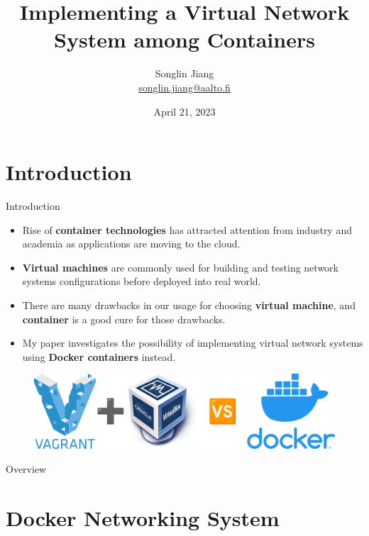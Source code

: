 \documentclass{beamer}
\title{Implementing a Virtual Network\\ System among Containers}
\author{\texorpdfstring{Songlin Jiang\\ \url{songlin.jiang@aalto.fi}}{Songlin Jiang}}
\institute{Tutor: Tuomas Aura}
\date{April 21, 2023}
\begin{document}
\frame{\titlepage}

\section{Introduction}
\begin{frame}{Introduction}
\begin{itemize}
\item Rise of \textbf{container technologies} has attracted attention from industry and academia as applications are moving to the cloud.
\item \textbf{Virtual machines} are commonly used for building and testing network systems configurations before deployed into real world.
\item There are many drawbacks in our usage for choosing \textbf{virtual machine}, and \textbf{container} is a good cure for those drawbacks.
\item My paper investigates the possibility of implementing virtual network systems using \textbf{Docker containers} instead.
\end{itemize}
\begin{figure}[t!]
  \begin{center}
    \includegraphics[scale=0.48]{slide/img/vs.png}
    \label{fig:demo}
  \end{center}
\end{figure}
\end{frame}

\begin{frame}{Overview}
    \tableofcontents
\end{frame}

\section{Docker Networking System}
\end{document}
